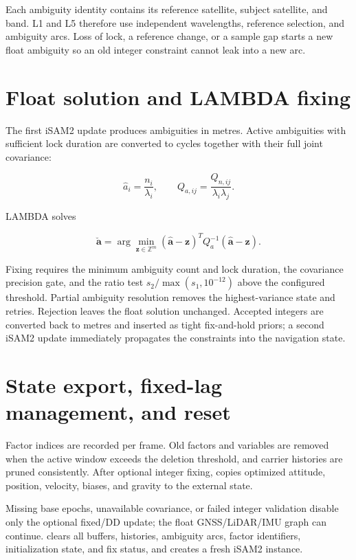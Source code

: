 \documentclass[11pt,a4paper]{article}
\newcommand{\code}[1]{\texttt{\detokenize{#1}}}
\begin{document}
Each ambiguity identity contains its reference satellite, subject satellite,
and band.  L1 and L5 therefore use independent wavelengths, reference
selection, and ambiguity arcs.  Loss of lock, a reference change, or a sample
gap starts a new float ambiguity so an old integer constraint cannot leak
into a new arc.

\section{Float solution and LAMBDA fixing}

The first iSAM2 update produces ambiguities in metres.  Active ambiguities
with sufficient lock duration are converted to cycles together with their
full joint covariance:

\begin{equation}
  \hat a_i=\frac{n_i}{\lambda_i}, \qquad
  Q_{a,ij}=\frac{Q_{n,ij}}{\lambda_i\lambda_j}.
\end{equation}

LAMBDA solves

\begin{equation}
  \breve{\mathbf a}=\arg\min_{\mathbf z \in \mathbb Z^m}
  (\hat{\mathbf a}-\mathbf z)^TQ_a^{-1}
  (\hat{\mathbf a}-\mathbf z).
\end{equation}

Fixing requires the minimum ambiguity count and lock duration, the covariance
precision gate, and the ratio test $s_2/\max(s_1,10^{-12})$ above the configured
threshold.  Partial ambiguity resolution removes the highest-variance state
and retries.  Rejection leaves the float solution unchanged.  Accepted
integers are converted back to metres and inserted as tight fix-and-hold
priors; a second iSAM2 update immediately propagates the constraints into the
navigation state.

\section{State export, fixed-lag management, and reset}

Factor indices are recorded per frame.  Old factors and variables are removed
when the active window exceeds the deletion threshold, and carrier histories
are pruned consistently.  After optional integer fixing,
\code{updateStateFromEstimate()} copies optimized attitude, position,
velocity, biases, and gravity to the external state.

Missing base epochs, unavailable covariance, or failed integer validation
disable only the optional fixed/DD update; the float GNSS/LiDAR/IMU graph can
continue.  \code{Reset()} clears all buffers, histories, ambiguity arcs,
factor identifiers, initialization state, and fix status, and creates a fresh
iSAM2 instance.
\end{document}
